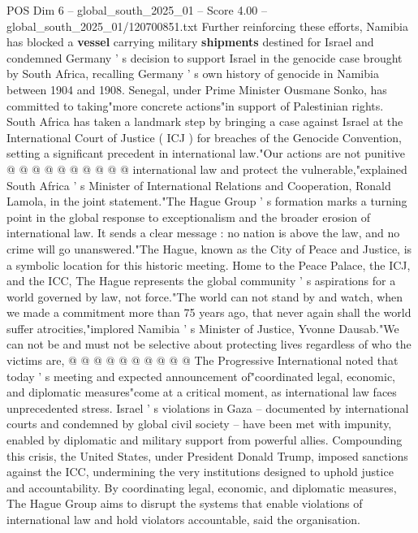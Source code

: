 \begin{textsample}{POS Dim 6 – global\_south\_2025\_01 – Score 4.00 – global\_south\_2025\_01/120700851.txt}
Further reinforcing these efforts, Namibia has blocked a \textbf{vessel} carrying military \textbf{shipments} destined for Israel and condemned Germany ' s decision to support Israel in the genocide case brought by South Africa, recalling Germany ' s own history of genocide in Namibia between 1904 and 1908.
Senegal, under Prime Minister Ousmane Sonko, has committed to taking"more concrete actions"in support of Palestinian rights.
South Africa has taken a landmark step by bringing a case against Israel at the International Court of Justice ( ICJ ) for breaches of the Genocide Convention, setting a significant precedent in international law."Our actions are not punitive @ @ @ @ @ @ @ @ @ @ international law and protect the vulnerable,"explained South Africa ' s Minister of International Relations and Cooperation, Ronald Lamola, in the joint statement."The Hague Group ' s formation marks a turning point in the global response to exceptionalism and the broader erosion of international law.
It sends a clear message : no nation is above the law, and no crime will go unanswered."The Hague, known as the City of Peace and Justice, is a symbolic location for this historic meeting.
Home to the Peace Palace, the ICJ, and the ICC, The Hague represents the global community ' s aspirations for a world governed by law, not force."The world can not stand by and watch, when we made a commitment more than 75 years ago, that never again shall the world suffer atrocities,"implored Namibia ' s Minister of Justice, Yvonne Dausab."We can not be and must not be selective about protecting lives regardless of who the victims are, @ @ @ @ @ @ @ @ @ @ The Progressive International noted that today ' s meeting and expected announcement of"coordinated legal, economic, and diplomatic measures"come at a critical moment, as international law faces unprecedented stress.
Israel ' s violations in Gaza -- documented by international courts and condemned by global civil society -- have been met with impunity, enabled by diplomatic and military support from powerful allies.
Compounding this crisis, the United States, under President Donald Trump, imposed sanctions against the ICC, undermining the very institutions designed to uphold justice and accountability.
By coordinating legal, economic, and diplomatic measures, The Hague Group aims to disrupt the systems that enable violations of international law and hold violators accountable, said the organisation.

\end{textsample}
